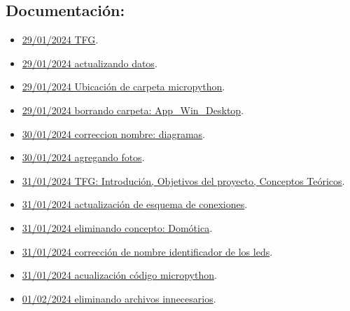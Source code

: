 \subsection{Documentación:}
\begin{itemize}
\item \href{https://github.com/JLCaballeroMQ/Proyecto_TFG_UBU_23_24/tree/aa1a2dd621f02da5e68ebddc63422f442693e895}{29/01/2024 TFG}.
\item \href{https://github.com/JLCaballeroMQ/Proyecto_TFG_UBU_23_24/tree/437c540dfc3dc349545f905f1d1c84905c8e1461}{29/01/2024 actualizando datos}.
\item \href{https://github.com/JLCaballeroMQ/Proyecto_TFG_UBU_23_24/tree/23013b214a42f467e5d02ae21c6d9031c4e42172}{29/01/2024 Ubicación de carpeta micropython}.
\item \href{https://github.com/JLCaballeroMQ/Proyecto_TFG_UBU_23_24/tree/9d1385a4788222bb5492069ec89c26373143562b}{29/01/2024 borrando carpeta: App_Win_Desktop}.
\item \href{https://github.com/JLCaballeroMQ/Proyecto_TFG_UBU_23_24/tree/036818b09847a74dcfe14002c6686df3d0eff2b7}{30/01/2024 correccion nombre: diagramas}.
\item \href{https://github.com/JLCaballeroMQ/Proyecto_TFG_UBU_23_24/tree/fd68392e32f7149cc4562bdc19bed9e303ff72f2}{30/01/2024 agregando fotos}.
\item \href{https://github.com/JLCaballeroMQ/Proyecto_TFG_UBU_23_24/tree/84933690311e83512979cb22a5d707d50476821f}{31/01/2024 TFG: Introdución, Objetivos del proyecto, Conceptos Teóricos}.
\item \href{https://github.com/JLCaballeroMQ/Proyecto_TFG_UBU_23_24/tree/4e094e765f3c14464d56ab8ce0d7fe97b6b9d66f}{31/01/2024 actualización de esquema de conexiones}.
\item \href{https://github.com/JLCaballeroMQ/Proyecto_TFG_UBU_23_24/tree/77ffbcfbff2ec5185e05704e8056a995b411eaae}{31/01/2024 eliminando concepto: Domótica}.
\item \href{https://github.com/JLCaballeroMQ/Proyecto_TFG_UBU_23_24/tree/9eb27daf27d225f459845da730d06e775ebfc21f}{31/01/2024 corrección de nombre identificador de los leds}.
\item \href{https://github.com/JLCaballeroMQ/Proyecto_TFG_UBU_23_24/tree/48b534e913b3fd96008fb99d39e997a8a37a1935}{31/01/2024 acualización código micropython}.
\item \href{https://github.com/JLCaballeroMQ/Proyecto_TFG_UBU_23_24/tree/0ab295cf9440c0251e414664d96ff38625f45013}{01/02/2024 eliminando archivos innecesarios}.

\end{itemize}

